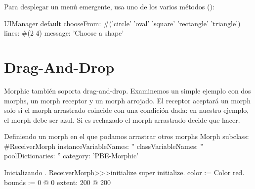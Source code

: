 \documentclass[a4paper,10pt,twoside]{book}
\begin{document}
Para desplegar un men\'u emergente, usa uno de los varios m\'etodos  ():
\begin{code}{}
UIManager default
	chooseFrom: #('circle' 'oval' 'square' 'rectangle' 'triangle')
	lines: #(2 4) message: 'Choose a shape'
\end{code}





\section{Drag-And-Drop}
Morphic tambi\'en soporta drag-and-drop. Examinemos un simple ejemplo con dos morphs, un morph receptor y un morph arrojado. 
El receptor aceptar\'a un morph solo si el morph arrastrado coincide con una condici\'on dada: en nuestro ejemplo, el morph debe ser azul. Si es rechazado el  morph arrastrado decide que hacer.

\begin{classdef}{Definiendo un morph en el que podamos arrastrar otros morphs}
Morph subclass: #ReceiverMorph
	instanceVariableNames: ''
	classVariableNames: ''
	poolDictionaries: ''
	category: 'PBE-Morphic'
\end{classdef}

\begin{method}{Inicializando .}
ReceiverMorph>>>initialize
	super initialize.
	color := Color red.
	bounds := 0 @ 0 extent: 200 @ 200
\end{method}
\end{document}

